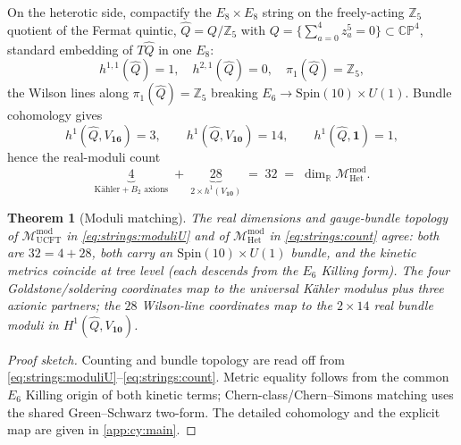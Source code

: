 \documentclass[11pt]{article}
\theoremstyle{plain}
\newtheorem{theorem}{Theorem}[section]
\theoremstyle{definition}
\theoremstyle{remark}
\begin{document}
On the heterotic side, compactify the $E_{8}\times E_{8}$ string on the
freely-acting $\mathbb{Z}_{5}$ quotient of the Fermat quintic,
$\widehat{Q}=Q/\mathbb{Z}_{5}$ with
$Q=\{\sum_{a=0}^{4}z_{a}^{5}=0\}\subset\mathbb{CP}^{4}$, standard
embedding of $T\widehat{Q}$ in one $E_{8}$:
\begin{equation}
  h^{1,1}(\widehat{Q})=1,\quad
  h^{2,1}(\widehat{Q})=0,\quad
  \pi_{1}(\widehat{Q})=\mathbb{Z}_{5},
  \label{eq:strings:hodge}
\end{equation}
the Wilson lines along $\pi_{1}(\widehat{Q})=\mathbb{Z}_{5}$ breaking
$E_{6}\to\mathrm{Spin}(10)\times U(1)$. Bundle cohomology gives
\begin{equation}
  h^{1}(\widehat{Q},V_{\mathbf{16}})=3,\qquad
  h^{1}(\widehat{Q},V_{\mathbf{10}})=14,\qquad
  h^{1}(\widehat{Q},\mathbf{1})=1,
  \label{eq:strings:bundle}
\end{equation}
hence the real-moduli count
\begin{equation}
  \underbrace{4}_{\text{K\"ahler}+B_{2}\text{ axions}}
  \;+\;
  \underbrace{28}_{2\times h^{1}(V_{\mathbf{10}})}
  \;=\;32
  \;=\;\dim_{\mathbb{R}}\mathcal{M}^{\mathrm{mod}}_{\mathrm{Het}} .
  \label{eq:strings:count}
\end{equation}

\begin{theorem}[Moduli matching]
\label{thm:strings:moduli}
The real dimensions and gauge-bundle topology of
$\mathcal{M}^{\mathrm{mod}}_{\mathrm{UCFT}}$ in
\eqref{eq:strings:moduliU} and of
$\mathcal{M}^{\mathrm{mod}}_{\mathrm{Het}}$ in \eqref{eq:strings:count}
agree: both are $32 = 4+28$, both carry an
$\mathrm{Spin}(10)\times U(1)$ bundle, and the kinetic metrics coincide
at tree level (each descends from the $E_{6}$ Killing form). The four
Goldstone/soldering coordinates map to the universal K\"ahler modulus
plus three axionic partners; the $28$ Wilson-line coordinates map to the
$2\times 14$ real bundle moduli in $H^{1}(\widehat{Q},V_{\mathbf{10}})$.
\end{theorem}

\begin{proof}[Proof sketch]
Counting and bundle topology are read off from
\eqref{eq:strings:moduliU}--\eqref{eq:strings:count}. Metric equality
follows from the common $E_{6}$ Killing origin of both kinetic terms;
Chern-class/Chern--Simons matching uses the shared Green--Schwarz
two-form. The detailed cohomology and the explicit map are given in
\autoref{app:cy:main}.
\end{proof}
\end{document}
